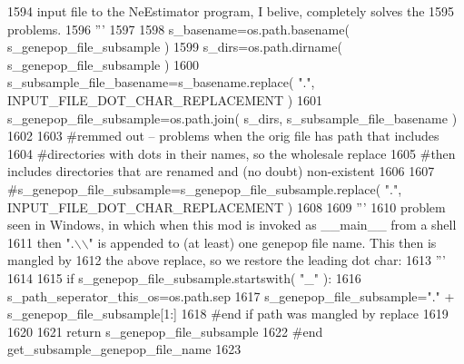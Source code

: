 \begin{DoxyCode}
1594 \textcolor{stringliteral}{    input file to the NeEstimator program, I belive, completely solves the}
1595 \textcolor{stringliteral}{    problems.}
1596 \textcolor{stringliteral}{    '''}
1597 
1598     s\_basename=os.path.basename( s\_genepop\_file\_subsample )
1599     s\_dirs=os.path.dirname( s\_genepop\_file\_subsample )
1600     s\_subsample\_file\_basename=s\_basename.replace( \textcolor{stringliteral}{"."}, INPUT\_FILE\_DOT\_CHAR\_REPLACEMENT )
1601     s\_genepop\_file\_subsample=os.path.join( s\_dirs, s\_subsample\_file\_basename )
1602     
1603     \textcolor{comment}{#remmed out -- problems when the orig file has path that includes }
1604     \textcolor{comment}{#directories with dots in their names, so the wholesale replace}
1605     \textcolor{comment}{#then includes directories that are renamed and (no doubt) non-existent}
1606 
1607     \textcolor{comment}{#s\_genepop\_file\_subsample=s\_genepop\_file\_subsample.replace( ".", INPUT\_FILE\_DOT\_CHAR\_REPLACEMENT )}
1608     
1609     \textcolor{stringliteral}{'''}
1610 \textcolor{stringliteral}{    problem seen in Windows, in which when this mod is invoked as \_\_main\_\_ from a shell}
1611 \textcolor{stringliteral}{    then ".\(\backslash\)\(\backslash\)" is appended to (at least) one genepop file name.  This then is mangled by}
1612 \textcolor{stringliteral}{    the above replace, so we restore the leading dot char:}
1613 \textcolor{stringliteral}{    '''}
1614 
1615     \textcolor{keywordflow}{if} s\_genepop\_file\_subsample.startswith(  \textcolor{stringliteral}{"\_"} ):
1616         s\_path\_seperator\_this\_os=os.path.sep
1617         s\_genepop\_file\_subsample=\textcolor{stringliteral}{"."} + s\_genepop\_file\_subsample[1:] 
1618     \textcolor{comment}{#end if path was mangled by replace}
1619 
1620 
1621     \textcolor{keywordflow}{return} s\_genepop\_file\_subsample
1622 \textcolor{comment}{#end get\_subsample\_genepop\_file\_name}
1623 
\end{DoxyCode}
